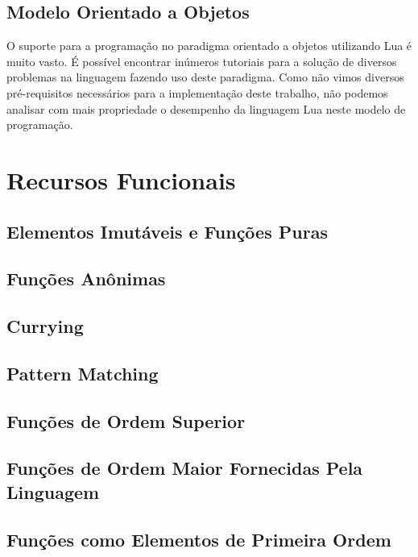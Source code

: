 \documentclass[rel_mlp]{iiufrgs}
\begin{document}
\section{Modelo Orientado a Objetos}

O suporte para a programação no paradigma orientado a objetos utilizando Lua é muito vasto. É possível encontrar inúmeros tutoriais para a solução de diversos problemas na linguagem fazendo uso deste paradigma. Como não vimos diversos pré-requisitos necessários para a implementação deste trabalho, não podemos analisar com mais propriedade o desempenho da linguagem Lua neste modelo de programação.



\chapter{Recursos Funcionais}

\section{Elementos Imutáveis e Funções Puras}

\section{Funções Anônimas}

\section{Currying}

\section{Pattern Matching}

\section{Funções de Ordem Superior}

\section{Funções de Ordem Maior Fornecidas Pela Linguagem}

\section{Funções como Elementos de Primeira Ordem}
\end{document}
